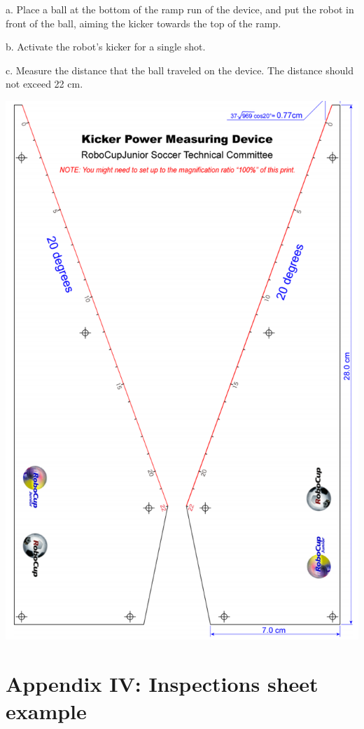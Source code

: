 \documentclass{article}
\begin{document}
a. Place a ball at the bottom of the ramp run of the device, and put the robot in front of the ball, aiming the kicker towards the top of the ramp. 

b. Activate the robot's kicker for a single shot. 

c. Measure the distance that the ball traveled on the device. The distance should not exceed 22 cm.

\includegraphics[width=1\textwidth]{media/image9.png}

\section{\textcolor{color-5}{Appendix IV: Inspections sheet example}\label{ref-065}}
\end{document}
